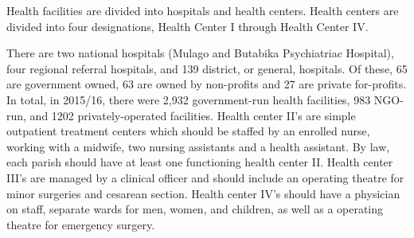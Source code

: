 \documentclass[12pt]{article} %
\begin{document}
Health facilities are divided into hospitals and health centers. Health centers are divided into four designations, Health Center I through Health Center IV. \cite{UBS2017}


There are two national hospitals (Mulago and Butabika Psychiatriac Hospital), four regional referral hospitals, and 139 district, or general, hospitals. Of these, 65 are government owned, 63 are owned by non-profits and 27 are private for-profits.
\cite{MOH-hosp-list}
In total, in 2015/16, there were 2,932 government-run health facilities, 983 NGO-run, and 1202 privately-operated facilities.
Health center II’s are simple outpatient treatment centers which should be staffed by an enrolled nurse, working with a midwife, two nursing assistants and a health assistant. By law, each parish should have at least one functioning health center II. 
Health center III’s are managed by a clinical officer and should include an operating theatre for minor surgeries and cesarean section. Health center IV’s should have a physician on staff, separate wards for men, women, and children, as well as a operating theatre for emergency surgery.
\end{document}
